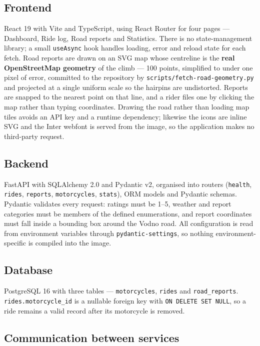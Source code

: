 \documentclass[10pt,a4paper]{article}
\newcommand{\cd}[1]{\texttt{\small #1}}
\begin{document}
\subsection{Frontend}

React 19 with Vite and TypeScript, using React Router for four pages ---
Dashboard, Ride log, Road reports and Statistics. There is no state-management
library; a small \cd{useAsync} hook handles loading, error and reload state
for each fetch. Road reports are drawn on an SVG map whose centreline is the
\textbf{real OpenStreetMap geometry} of the climb --- 100 points, simplified to
under one pixel of error, committed to the repository by
\cd{scripts/fetch-road-geometry.py} and projected at a single uniform scale so
the hairpins are undistorted. Reports are snapped to the nearest point on that
line, and a rider files one by clicking the map rather than typing
coordinates. Drawing the road rather than loading map tiles avoids an API key
and a runtime dependency; likewise the icons are inline SVG and the Inter
webfont is served from the image, so the application makes no third-party
request.

\subsection{Backend}

FastAPI with SQLAlchemy 2.0 and Pydantic v2, organised into routers
(\cd{health}, \cd{rides}, \cd{reports}, \cd{motorcycles}, \cd{stats}), ORM
models and Pydantic schemas. Pydantic validates every request: ratings must be
1--5, weather and report categories must be members of the defined
enumerations, and report coordinates must fall inside a bounding box around
the Vodno road. All configuration is read from environment variables through
\cd{pydantic-settings}, so nothing environment-specific is compiled into the
image.

\subsection{Database}

PostgreSQL 16 with three tables --- \cd{motorcycles}, \cd{rides} and
\cd{road\_reports}. \cd{rides.motorcycle\_id} is a nullable foreign key with
\cd{ON DELETE SET NULL}, so a ride remains a valid record after its motorcycle
is removed.

\subsection{Communication between services}
\end{document}

